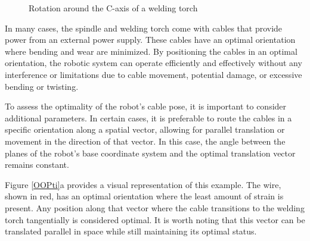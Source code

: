 \begin{figure}[H]%
	\centering
	\qquad
	\caption{Rotation around the C-axis of a welding torch }%
	\label{rot}%
\end{figure}

In many cases, the spindle and welding torch come with cables that provide power from an external power supply. These cables have an optimal orientation where bending and wear are minimized. By positioning the cables in an optimal orientation, the robotic system can operate efficiently and effectively without any interference or limitations due to cable movement, potential damage, or excessive bending or twisting.

To assess the optimality of the robot's cable pose, it is important to consider additional parameters. In certain cases, it is preferable to route the cables in a specific orientation along a spatial vector, allowing for parallel translation or movement in the direction of that vector. In this case, the angle between the planes of the robot's base coordinate system and the optimal translation vector remains constant.

Figure \ref{OOPti}a provides a visual representation of this example. The wire, shown in red, has an optimal orientation where the least amount of strain is present. Any position along that vector where the cable transitions to the welding torch tangentially is considered optimal. It is worth noting that this vector can be translated parallel in space while still maintaining its optimal status.

